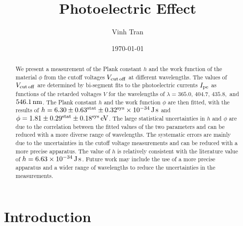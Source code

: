 \documentclass[aps,twocolumn,secnumarabic,balancelastpage,amsmath,amssymb,nofootinbib,floatfix]{revtex4-1}
\newcommand{\ev}{\,{\rm eV}}
\newcommand{\nm}{\,{\rm nm}}
\newcommand{\Js}{\,{\rm J}\,{\rm s}}
\begin{document}
\title{Photoelectric Effect}

\author{Vinh Tran}

\date{\today}


\begin{abstract}

We present a measurement of the Plank constant $h$ and the work function of the material $\phi$ from the cutoff voltages $V_{\rm{cut\,off}}$ at different wavelengths. The values of $V_{\rm{cut\,off}}$ are determined by bi-segment fits to the photoelectric currents $I_{\rm{pe}}$ as functions of the retarded voltages $V$ for the wavelengths of $\lambda = 365.0, \, 404.7, \, 435.8,$ and $546.1\nm$. The Plank constant $h$ and the work function $\phi$ are then fitted, with the results of $h = 6.30 \pm 0.63^{\rm{stat}} \pm 0.32^{\rm{sys}} \times 10^{-34}\Js$ and $\phi = 1.81 \pm 0.29^{\rm{stat}} \pm 0.18^{\rm{sys}}\ev$. The large statistical uncertainties in $h$ and $\phi$ are due to the correlation between the fitted values of the two parameters and can be reduced with a more diverse range of wavelengths. The systematic errors are mainly due to the uncertainties in the cutoff voltage measurements and can be reduced with a more precise apparatus. The value of $h$ is relatively consistent with the literature value of $h = 6.63 \times 10^{-34}\Js$. Future work may include the use of a more precise apparatus and a wider range of wavelengths to reduce the uncertainties in the measurements.

\end{abstract}

\maketitle


\section{Introduction}
\label{sec:intro}
\end{document}
